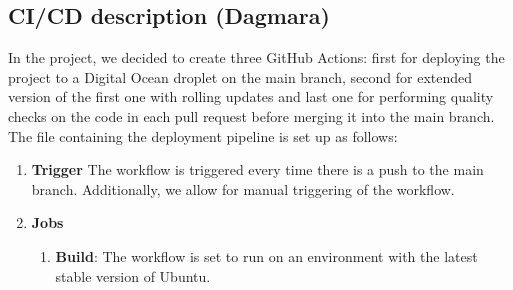 \documentclass{article}
\begin{document}
\subsection{CI/CD description (Dagmara)}
In the project, we decided to create three GitHub Actions: first for deploying the project to a Digital Ocean droplet on the main branch, second for extended version of the first one with rolling updates and last one for performing quality checks on the code in each pull request before merging it into the main branch. The file containing the deployment pipeline is set up as follows:
\begin{enumerate}
\item \textbf{Trigger}
The workflow is triggered every time there is a push to the main branch. Additionally, we allow for manual triggering of the workflow.

\item \textbf{Jobs}
\begin{enumerate}
    \item \textbf{Build}: The workflow is set to run on an environment with the latest stable version of Ubuntu.


\end{enumerate}
\end{enumerate}
\end{document}
